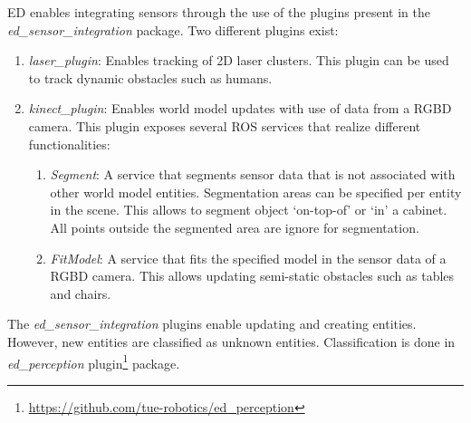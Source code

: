 ED enables integrating sensors through the use of the plugins present in the \textit{ed\_sensor\_integration} package.
Two different plugins exist:
\begin{enumerate}
\item \emph{laser\_plugin}: Enables tracking of 2D laser clusters. This plugin can be used to track dynamic obstacles such as humans.
\item \emph{kinect\_plugin}: Enables world model updates with use of data from a RGBD camera. This plugin exposes several ROS services that realize different functionalities:
\begin{enumerate}[label=(\alph*)]
\item \emph{Segment}: A service that segments sensor data that is not associated with other world model entities. Segmentation areas can be specified per entity in the scene. This allows to segment object `on-top-of’ or ‘in’ a cabinet. All points outside the segmented area are ignore for segmentation.
\item \emph{FitModel}: A service that fits the specified model in the sensor data of a RGBD camera. This allows updating semi-static obstacles such as tables and chairs.
\end{enumerate}
\end{enumerate}

\noindent The \emph{ed\_sensor\_integration} plugins enable updating and creating entities. However, new entities are classified as unknown entities. Classification is done in \emph{ed\_perception} plugin\footnote{\url{https://github.com/tue-robotics/ed_perception}} package.
